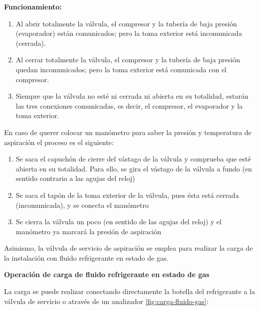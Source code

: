 \textbf{Funcionamiento:}

\begin{enumerate}[1.]
    \item Al abrir totalmente la v\'alvula, el compresor y la tuber\'ia de baja presi\'on (evaporador) est\'an comunicados; pero la toma exterior est\'a incomunicada (cerrada).
    \item Al cerrar totalmente la v\'alvula, el compresor y la tuber\'ia de baja presi\'on quedan incomunicados; pero la toma exterior est\'a comunicada con el compresor.
    \item Siempre que la v\'alvula no est\'e ni cerrada ni abierta en su totalidad, estar\'an las tres conexiones comunicadas, es decir, el compresor, el evaporador y la toma exterior.
\end{enumerate}

En caso de querer colocar un man\'ometro para saber la presi\'on y temperatura de aspiraci\'on el proceso es el siguiente:

\begin{enumerate}[1.]
    \item Se saca el capuch\'on de cierre del v\'astago de la v\'alvula y comprueba que est\'e abierta en su totalidad. Para ello, se gira el v\'astago de la v\'alvula a fundo (en sentido contrario a las agujas del reloj)
    \item Se saca el tap\'on de la toma exterior de la v\'alvula, pues \'esta est\'a cerrada (incomunicada), y se conecta el man\'ometro
    \item Se cierra la v\'alvula un poco (en sentido de las agujas del reloj) y el man\'ometro ya marcar\'a la presi\'on de aspiraci\'on
\end{enumerate}

Asimismo, la v\'alvula de servicio de aspiraci\'on se emplea para realizar la carga de la instalaci\'on con fluido refrigerante en estado de gas. 

\textbf{Operaci\'on de carga de fluido refrigerante en estado de gas}

La carga se puede realizar conectando directamente la botella del refrigerante a la v\'alvula de servicio o atrav\'es de un analizador \autoref{fig:carga-fluido-gas}:

